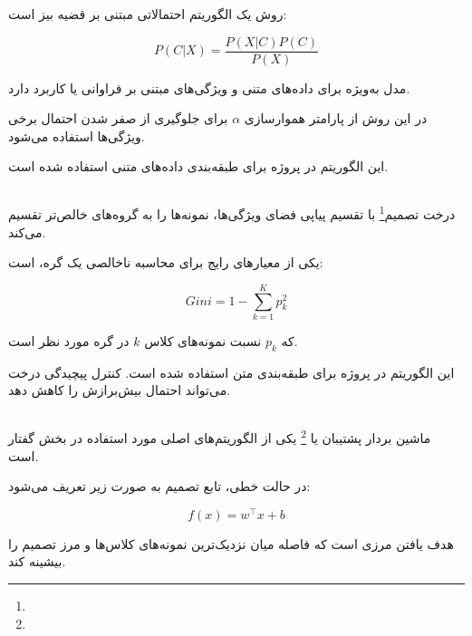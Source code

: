 روش
یک الگوریتم احتمالاتی مبتنی بر قضیه بیز است:

\begin{equation}
P(C|X)
=
\frac{
P(X|C)P(C)
}{
P(X)
}
\end{equation}

مدل
به‌ویژه برای داده‌های متنی و ویژگی‌های مبتنی بر فراوانی یا
کاربرد دارد.

در این روش از پارامتر هموارسازی
$\alpha$
برای جلوگیری از صفر شدن احتمال برخی ویژگی‌ها استفاده می‌شود.

این الگوریتم در پروژه برای طبقه‌بندی داده‌های متنی استفاده شده است.


\subsection{}

درخت تصمیم\footnote{} با تقسیم پیاپی فضای ویژگی‌ها، نمونه‌ها را به گروه‌های خالص‌تر تقسیم می‌کند.

یکی از معیارهای رایج برای محاسبه ناخالصی یک گره،
است:

\begin{equation}
Gini
=
1-
\sum_{k=1}^{K}
p_k^2
\end{equation}

که $p_k$ نسبت نمونه‌های کلاس $k$ در گره مورد نظر است.

این الگوریتم در پروژه برای طبقه‌بندی متن استفاده شده است. کنترل پیچیدگی درخت می‌تواند احتمال بیش‌برازش را کاهش دهد.


\subsection{}

ماشین بردار پشتیبان یا
\footnote{}
یکی از الگوریتم‌های اصلی مورد استفاده در بخش گفتار است.

در حالت خطی، تابع تصمیم به صورت زیر تعریف می‌شود:

\begin{equation}
f(x)
=
w^\top x+b
\end{equation}

هدف
یافتن مرزی است که فاصله میان نزدیک‌ترین نمونه‌های کلاس‌ها و مرز تصمیم را بیشینه کند.


